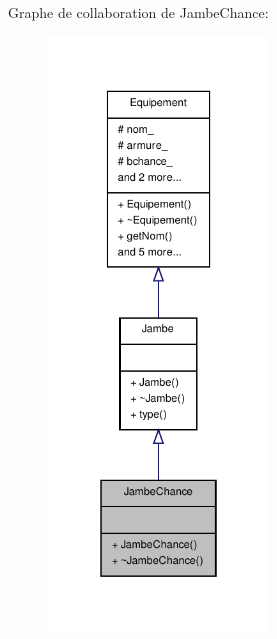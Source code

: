 Graphe de collaboration de Jambe\-Chance\-:
\nopagebreak
\begin{figure}[H]
\begin{center}
\leavevmode
\includegraphics[width=166pt]{class_jambe_chance__coll__graph}
\end{center}
\end{figure}
